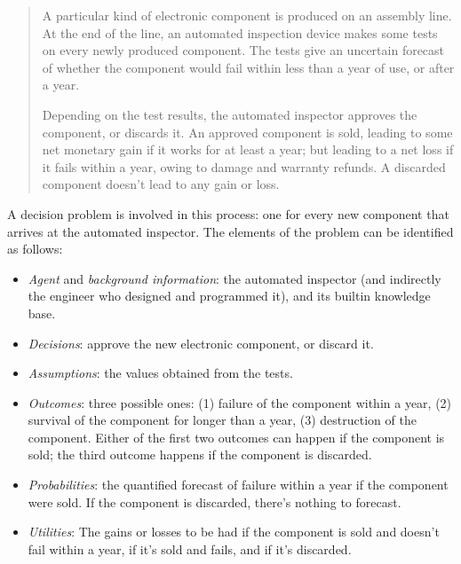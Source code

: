 \documentclass[
  a4paper,
  DIV=11,
  numbers=noendperiod,
  oneside]{scrreprt}
\providecommand{\tightlist}{%
  \setlength{\itemsep}{0pt}\setlength{\parskip}{0pt}}\usepackage{longtable,booktabs,array}
\begin{document}
\begin{tcolorbox}[enhanced jigsaw, bottomrule=.15mm, leftrule=.75mm, opacitybacktitle=0.6, breakable, toptitle=1mm, coltitle=black, title={Example}, rightrule=.15mm, left=2mm, colframe=quarto-callout-note-color-frame, bottomtitle=1mm, arc=.35mm, titlerule=0mm, toprule=.15mm, opacityback=0, colback=white, colbacktitle=quarto-callout-note-color!10!white]

\begin{quote}
A particular kind of electronic component is produced on an assembly
line. At the end of the line, an automated inspection device makes some
tests on every newly produced component. The tests give an uncertain
forecast of whether the component would fail within less than a year of
use, or after a year.

Depending on the test results, the automated inspector approves the
component, or discards it. An approved component is sold, leading to
some net monetary gain if it works for at least a year; but leading to a
net loss if it fails within a year, owing to damage and warranty
refunds. A discarded component doesn't lead to any gain or loss.\\
\end{quote}

A decision problem is involved in this process: one for every new
component that arrives at the automated inspector. The elements of the
problem can be identified as follows:

\begin{itemize}
\tightlist
\item
  \emph{Agent} and \emph{background information}: the automated
  inspector (and indirectly the engineer who designed and programmed
  it), and its builtin knowledge base.
\item
  \emph{Decisions}: approve the new electronic component, or discard it.
\item
  \emph{Assumptions}: the values obtained from the tests.
\item
  \emph{Outcomes}: three possible ones: (1) failure of the component
  within a year, (2) survival of the component for longer than a year,
  (3) destruction of the component. Either of the first two outcomes can
  happen if the component is sold; the third outcome happens if the
  component is discarded.
\item
  \emph{Probabilities}: the quantified forecast of failure within a year
  if the component were sold. If the component is discarded, there's
  nothing to forecast.
\item
  \emph{Utilities}: The gains or losses to be had if the component is
  sold and doesn't fail within a year, if it's sold and fails, and if
  it's discarded.
\end{itemize}

\end{tcolorbox}
\end{document}
